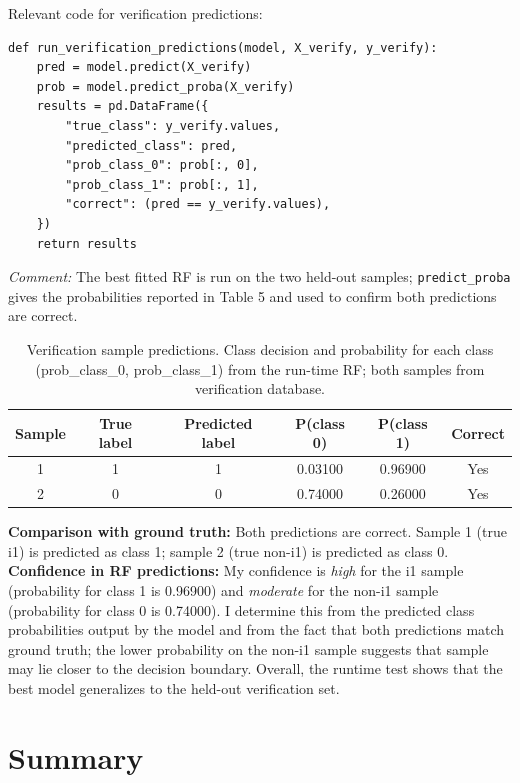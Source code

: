 \documentclass[11pt]{article}
\begin{document}
Relevant code for verification predictions:

\begin{lstlisting}[style=pythonstyle]
def run_verification_predictions(model, X_verify, y_verify):
    pred = model.predict(X_verify)
    prob = model.predict_proba(X_verify)
    results = pd.DataFrame({
        "true_class": y_verify.values,
        "predicted_class": pred,
        "prob_class_0": prob[:, 0],
        "prob_class_1": prob[:, 1],
        "correct": (pred == y_verify.values),
    })
    return results
\end{lstlisting}

\textit{Comment:} The best fitted RF is run on the two held-out samples; \texttt{predict\_proba} gives the probabilities reported in Table 5 and used to confirm both predictions are correct.

\begin{table}[H]
\centering
\caption{Verification sample predictions. Class decision and probability for each class (prob\_class\_0, prob\_class\_1) from the run-time RF; both samples from verification database.}
\begin{tabular}{cccccc}
\toprule
\textbf{Sample} & \textbf{True label} & \textbf{Predicted label} & \textbf{P(class 0)} & \textbf{P(class 1)} & \textbf{Correct} \\
\midrule
1 & 1 & 1 & 0.03100 & 0.96900 & Yes \\
2 & 0 & 0 & 0.74000 & 0.26000 & Yes \\
\bottomrule
\end{tabular}
\end{table}

\textbf{Comparison with ground truth:} Both predictions are correct. Sample 1 (true i1) is predicted as class 1; sample 2 (true non-i1) is predicted as class 0. \textbf{Confidence in RF predictions:} My confidence is \emph{high} for the i1 sample (probability for class 1 is 0.96900) and \emph{moderate} for the non-i1 sample (probability for class 0 is 0.74000). I determine this from the predicted class probabilities output by the model and from the fact that both predictions match ground truth; the lower probability on the non-i1 sample suggests that sample may lie closer to the decision boundary. Overall, the runtime test shows that the best model generalizes to the held-out verification set.

\section{Summary}
\end{document}
